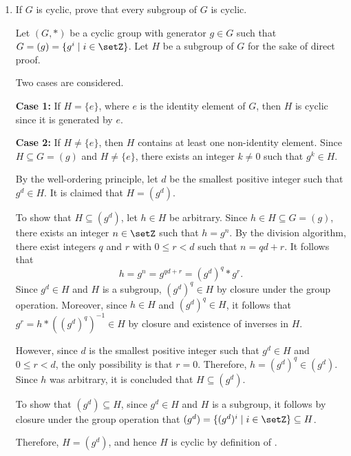 \begin{enumerate}
\begin{enumerate}
\begin{subprove}
      Therefore, since $V_4$ is an abelian group that is not cyclic, the statement that an abelian group is cyclic is disproved.
    \end{subprove}
  \end{enumerate}




  \newpage
  \item If $G$ is cyclic, prove that every subgroup of $G$ is cyclic.
  \begin{subprove}
    Let $(G, *)$ be a cyclic group with generator $g \in G$ such that $G = (g) = \{g^i \mid i \in \setZ\}$.
    Let $H$ be a subgroup of $G$ for the sake of direct proof.
    
    Two cases are considered.
    
    \textbf{Case 1:} If $H = \{e\}$, where $e$ is the identity element of $G$, then $H$ is cyclic since it is generated by $e$.
    
    \textbf{Case 2:} If $H \neq \{e\}$, then $H$ contains at least one non-identity element.
    Since $H \subseteq G = (g)$ and $H \neq \{e\}$, there exists an integer $k \neq 0$ such that $g^k \in H$.
    
    By the well-ordering principle, let $d$ be the smallest positive integer such that $g^d \in H$.
    It is claimed that $H = (g^d)$.
    
    To show that $H \subseteq (g^d)$, let $h \in H$ be arbitrary.
    Since $h \in H \subseteq G = (g)$, there exists an integer $n \in \setZ$ such that $h = g^n$.
    By the division algorithm, there exist integers $q$ and $r$ with $0 \leq r < d$ such that $n = qd + r$.
    It follows that
    \[
      h = g^n = g^{qd + r} = (g^d)^q * g^r.
    \]
    Since $g^d \in H$ and $H$ is a subgroup, $(g^d)^q \in H$ by closure under the group operation.
    Moreover, since $h \in H$ and $(g^d)^q \in H$, it follows that $g^r = h * ((g^d)^q)^{-1} \in H$ by closure and existence of inverses in $H$.
    
    However, since $d$ is the smallest positive integer such that $g^d \in H$ and $0 \leq r < d$, 
    the only possibility is that $r = 0$.
    Therefore, $h = (g^d)^q \in (g^d)$.
    Since $h$ was arbitrary, it is concluded that $H \subseteq (g^d)$.
    
    To show that $(g^d) \subseteq H$, since $g^d \in H$ and $H$ is a subgroup, 
    it follows by closure under the group operation that $(g^d) = \{(g^d)^i \mid i \in \setZ\} \subseteq H$.
    
    Therefore, $H = (g^d)$, and hence $H$ is cyclic by definition of .
    

\end{subprove}
\end{enumerate}
